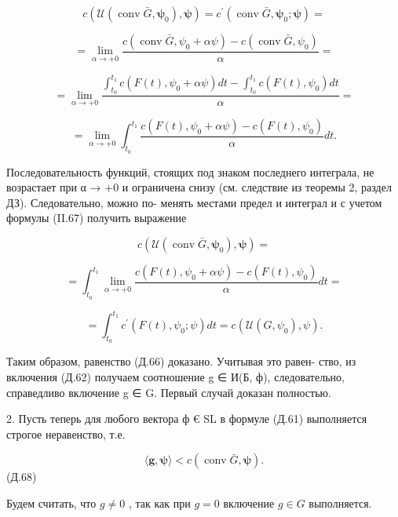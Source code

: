 \documentclass[8pt]{extarticle}
\begin{document}
\[
c\left( {\mathcal{U}\left( {\operatorname{conv}\bar{G},{\mathbf{\psi }}_{0}}\right) ,\mathbf{\psi }}\right)  = {c}^{\prime }\left( {\operatorname{conv}\bar{G},{\mathbf{\psi }}_{0};\mathbf{\psi }}\right)  =
\]

\[
= \mathop{\lim }\limits_{{\alpha  \rightarrow   + 0}}\frac{c\left( {\operatorname{conv}\bar{G},{\psi }_{0} + {\alpha \psi }}\right)  - c\left( {\operatorname{conv}\bar{G},{\psi }_{0}}\right) }{\alpha } =
\]

\[
= \mathop{\lim }\limits_{{\alpha  \rightarrow   + 0}}\frac{{\int }_{{t}_{0}}^{{t}_{1}}c\left( {F\left( t\right) ,{\psi }_{0} + {\alpha \psi }}\right) {dt} - {\int }_{{t}_{0}}^{{t}_{1}}c\left( {F\left( t\right) ,{\psi }_{0}}\right) {dt}}{\alpha } =
\]

\[
= \mathop{\lim }\limits_{{\alpha  \rightarrow   + 0}}{\int }_{{t}_{0}}^{{t}_{1}}\frac{c\left( {F\left( t\right) ,{\psi }_{0} + {\alpha \psi }}\right)  - c\left( {F\left( t\right) ,{\psi }_{0}}\right) }{\alpha }{dt}.
\]

Последовательность функций, стоящих под знаком последнего интеграла, не возрастает при α → +0 и ограничена снизу (см. следствие из теоремы 2, раздел ДЗ). Следовательно, можно по- менять местами предел и интеграл и с учетом формулы (II.67) получить выражение

\[
c\left( {\mathcal{U}\left( {\operatorname{conv}\bar{G},{\mathbf{\psi }}_{0}}\right) ,\mathbf{\psi }}\right)  =
\]

\[
= {\int }_{{t}_{0}}^{{t}_{1}}\mathop{\lim }\limits_{{\alpha  \rightarrow   + 0}}\frac{c\left( {F\left( t\right) ,{\psi }_{0} + {\alpha \psi }}\right)  - c\left( {F\left( t\right) ,{\psi }_{0}}\right) }{\alpha }{dt} =
\]

\[
= {\int }_{{t}_{0}}^{{t}_{1}}{c}^{\prime }\left( {F\left( t\right) ,{\psi }_{0};\psi }\right) {dt} = c\left( {\mathcal{U}\left( {G,{\psi }_{0}}\right) ,\psi }\right) .
\]

Таким образом, равенство (Д.66) доказано. Учитывая это равен- ство, из включения (Д.62) получаем соотношение g ∈ И(Б, ф), следовательно, справедливо включение g ∈ G. Первый случай доказан полностью.

2. Пусть теперь для любого вектора ф € SL в формуле (Д.61) выполняется строгое неравенство, т.е.

\[
\langle \mathbf{g},\mathbf{\psi }\rangle  < c\left( {\operatorname{conv}\bar{G},\mathbf{\psi }}\right) .
\]
 (Д.68)

Будем считать, что \(g \neq  0\) , так как при \(g = 0\) включение \(g \in  G\) выполняется.
\end{document}
